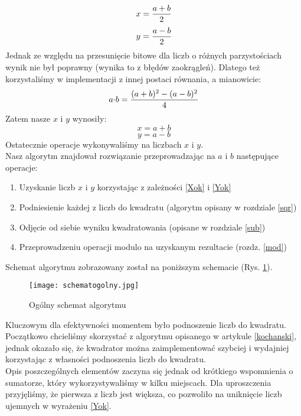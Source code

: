 \documentclass[a4paper]{article}
\begin{document}
\begin{equation} \label{cntX}
 x = {{a+b} \over 2}
\end{equation}
 \begin{equation} \label{cntY}
y = {{a-b} \over 2}
\end{equation}
\indent Jednak ze względu na przesunięcie bitowe dla liczb o różnych parzystościach wynik nie był poprawny (wynika to z błędów zaokrągleń).
 Dlatego też korzystaliśmy w implementacji z innej postaci równania, a mianowicie:
\begin{equation}
 a{\cdot}b = {{(a+b)^2 - (a-b)^2} \over 4}
\end{equation}
\indent Zatem nasze $x$ i $y$ wynosiły:
\begin{equation} \label{Xok}
 x = {a+b}
\end{equation}
 \begin{equation} \label{Yok}
y = {a-b}
\end{equation}
\indent Ostatecznie operacje wykonywaliśmy na liczbach $x$ i $y$. 
\\ \indent Nasz algorytm znajdował rozwiązanie przeprowadzając na $a$ i $b$ następujące operacje:
\begin{enumerate}
 \item Uzyskanie liczb $x$ i $y$ korzystając z zależności \ref{Xok} i \ref{Yok}
 \item Podniesienie każdej z liczb do kwadratu (algorytm opisany w rozdziale \ref{sqr})
 \item Odjęcie od siebie wyniku kwadratowania (opisane w rozdziale \ref{sub})
 \item Przeprowadzeniu operacji modulo na uzyskanym rezultacie (rozdz. \ref{mod})
\end{enumerate}
\indent Schemat algorytmu zobrazowany został na poniższym schemacie (Rys. \ref{schem}).
\begin{figure} [H]
 \centering
 \texttt{[image: schematogolny.jpg]}
 \caption{Ogólny schemat algorytmu}
 \label{schem}
\end{figure}


\indent Kluczowym dla efektywności momentem było podnoszenie liczb do kwadratu. Początkowo chcieliśmy skorzystać z algorytmu opisanego w artykule \ref{kochanski},
jednak okazało się, że kwadrator można zaimplementować szybciej i wydajniej korzystając z własności podnoszenia liczb do kwadratu. \\ \indent
 Opis poszczególnych elementów zaczyna się jednak od krótkiego wspomnienia o sumatorze, który
wykorzystywaliśmy w kilku miejscach. Dla uproszczenia przyjęliśmy, że pierwsza z liczb jest większa, co pozwoliło na uniknięcie liczb ujemnych w wyrażeniu \ref{Yok}.
\end{document}

